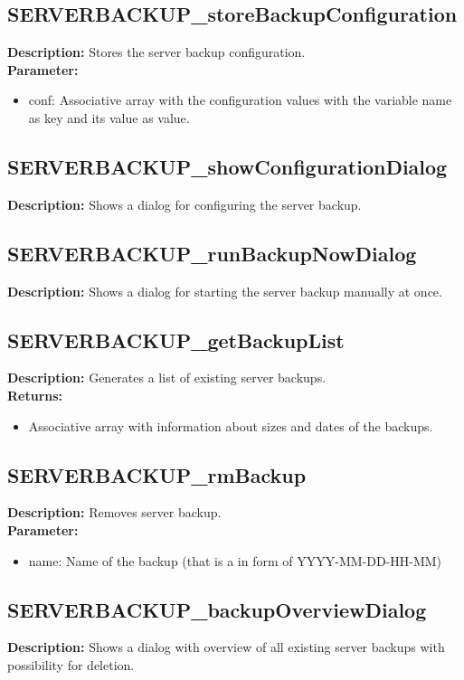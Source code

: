 \subsection{SERVERBACKUP\_storeBackupConfiguration}
\textbf{Description:} Stores the server backup configuration.\\
\textbf{Parameter:}
\begin{itemize}
\item conf: Associative array with the configuration values with the variable name as key and its value as value.
\end{itemize}

\subsection{SERVERBACKUP\_showConfigurationDialog}
\textbf{Description:} Shows a dialog for configuring the server backup.\\

\subsection{SERVERBACKUP\_runBackupNowDialog}
\textbf{Description:} Shows a dialog for starting the server backup manually at once.\\

\subsection{SERVERBACKUP\_getBackupList}
\textbf{Description:} Generates a list of existing server backups.\\
\textbf{Returns:}
\begin{itemize}
\item Associative array with information about sizes and dates of the backups.
\end{itemize}

\subsection{SERVERBACKUP\_rmBackup}
\textbf{Description:} Removes server backup.\\
\textbf{Parameter:}
\begin{itemize}
\item name: Name of the backup (that is a in form of YYYY-MM-DD-HH-MM)
\end{itemize}

\subsection{SERVERBACKUP\_backupOverviewDialog}
\textbf{Description:} Shows a dialog with overview of all existing server backups with possibility for deletion.\\

